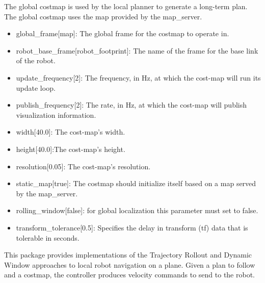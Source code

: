 \documentclass[10pt,journal,compsoc]{IEEEtran}
\begin{document}
The global costmap is used by the local planner to generate a long-term plan. The global costmap uses the map provided by the map\_server.

\begin{itemize}
\item global\_frame[map]: The global frame for the costmap to operate in.
\item robot\_base\_frame[robot\_footprint]: The name of the frame for the base link of the robot. 
\item update\_frequency[2]: The frequency, in Hz, at which the cost-map will run its update loop. 
\item publish\_frequency[2]: The rate, in Hz, at which the cost-map will publish visualization information.
\item width[40.0]: The cost-map's width.
\item height[40.0]:The cost-map's height.
\item resolution[0.05]: The cost-map's resolution.
\item static\_map[true]: The costmap should initialize itself based on a map served by the map\_server.
\item rolling\_window[false]: for global localization this parameter must set to false.
\item transform\_tolerance[0.5]: Specifies the delay in transform (tf) data that is tolerable in seconds. 
\end{itemize}

This package provides implementations of the Trajectory Rollout and Dynamic Window approaches to local robot navigation on a plane. Given a plan to follow and a costmap, the controller produces velocity commands to send to the robot.
\end{document}
